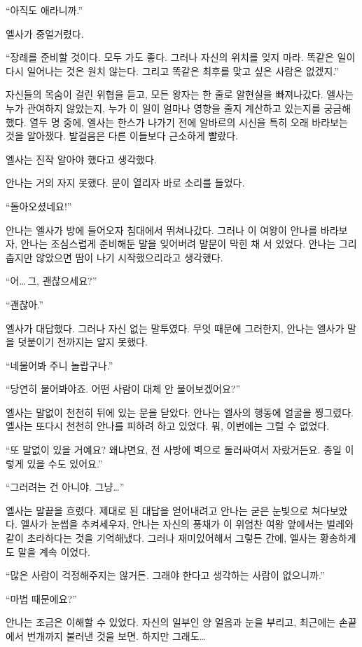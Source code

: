 ``아직도 애라니까.''

엘사가 중얼거렸다.

``장례를 준비할 것이다. 모두 가도 좋다. 그러나 자신의 위치를 잊지 마라. 똑같은 일이 다시 일어나는 것은 원치 않는다. 그리고 똑같은 최후를 맞고 싶은 사람은 없겠지.''

자신들의 목숨이 걸린 위협을 듣고, 모든 왕자는 한 줄로 알현실을 빠져나갔다. 엘사는 누가 관여하지 않았는지, 누가 이 일이 얼마나 영향을 줄지 계산하고 있는지를 궁금해했다. 열두 명 중에, 엘사는 한스가 나가기 전에 알바르의 시신을 특히 오래 바라보는 것을 알아챘다. 발걸음은 다른 이들보다 근소하게 빨랐다.

엘사는 진작 알아야 했다고 생각했다.

\textbreak

안나는 거의 자지 못했다. 문이 열리자 바로 소리를 들었다.

``돌아오셨네요!''

안나는 엘사가 방에 들어오자 침대에서 뛰쳐나갔다. 그러나 이 여왕이 안나를 바라보자, 안나는 조심스럽게 준비해둔 말을 잊어버려 말문이 막힌 채 서 있었다. 안나는 그리 춥지만 않았으면 땀이 나기 시작했으리라고 생각했다.

``어\ldots\,그, 괜찮으세요?''

``괜찮아.''

엘사가 대답했다. 그러나 자신 없는 말투였다. 무엇 때문에 그러한지, 안나는 엘사가 말을 덧붙이기 전까지는 알지 못했다.

``네 물어봐 주니 놀랍구나.''

``당연히 물어봐야죠. 어떤 사람이 대체 안 물어보겠어요?''

엘사는 말없이 천천히 뒤에 있는 문을 닫았다. 안나는 엘사의 행동에 얼굴을 찡그렸다. 엘사는 또다시 천천히 안나를 피하려 하고 있었다. 뭐, 이번에는 그럴 수 없었다.

``또 말없이 있을 거예요? 왜냐면요, 전 사방에 벽으로 둘러싸여서 자랐거든요. 종일 이렇게 있을 수도 있어요.''

``그러려는 건 아니야. 그냥\ldots''

엘사는 말끝을 흐렸다. 제대로 된 대답을 얻어내려고 안나는 굳은 눈빛으로 쳐다보았다. 엘사가 눈썹을 추켜세우자, 안나는 자신의 풍채가 이 위엄찬 여왕 앞에서는 벌레와 같이 초라하다는 것을 기억해냈다. 그러나 재미있어해서 그렇든 간에, 엘사는 황송하게도 말을 계속 이었다.

``많은 사람이 걱정해주지는 않거든. 그래야 한다고 생각하는 사람이 없으니까.''

``마법 때문에요?''

안나는 조금은 이해할 수 있었다. 자신의 일부인 양 얼음과 눈을 부리고, 최근에는 손끝에서 번개까지 불러낸 것을 보면. 하지만 그래도\ldots

